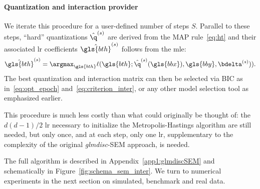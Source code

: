 \paragraph{Quantization and interaction provider}

We iterate this procedure for a user-defined number of steps $S$. Parallel to these steps, ``hard'' quantizations $\hat{\q}^{(s)}$ are derived from the MAP rule~\eqref{eq:ht} and their associated \gls{lr} coefficients $\hat{\gls{bth}}^{(s)}$ follows from the \gls{mle}:
\[\hat{\gls{bth}}^{(s)} = \argmax_{\gls{bth}} \ell(\gls{bth}; \hat{\q}^{(s)}(\gls{bbx}), \gls{bby}, \bdelta^{(s)})).\]
The best quantization and interaction matrix can then be selected via BIC as in~\eqref{eq:opt_epoch} and~\eqref{eq:criterion_inter}, or any other model selection tool as emphasized earlier.

This procedure is much less costly than what could originally be thought of: the $d(d-1)/2$ \gls{lr} necessary to initialize the Metropolis-Hastings algorithm are still needed, but only once, and at each step, only one \gls{lr}, supplementary to the complexity of the original \textit{glmdisc}-SEM approach, is needed.

The full algorithm is described in Appendix~\ref{app1:glmdiscSEM} and schematically in Figure~\ref{fig:schema_sem_inter}. We turn to numerical experiments in the next section on simulated, benchmark and real data.

